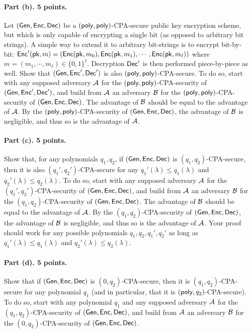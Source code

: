 \documentclass{article}
\begin{document}
\paragraph{Part (b). 5 points.} Let $({\sf Gen},{\sf Enc},{\sf Dec})$ be a $({\sf poly},{\sf poly})$-CPA-secure public key encryption scheme, but which is only capable of encrypting a single bit (as opposed to arbitrary bit strings). A simple way to extend it to arbitrary bit-strings is to encrypt bit-by-bit: ${\sf Enc}'({\sf pk},m)=({\sf Enc}({\sf pk},m_0),{\sf Enc}({\sf pk},m_1),\cdots,{\sf Enc}({\sf pk},m_\ell))$ where $m=(m_1,\cdots,m_\ell)\in\{0,1\}^\ell$. Decryption ${\sf Dec}'$ is then performed piece-by-piece as well. Show that $({\sf Gen},{\sf Enc}',{\sf Dec}')$ is also $({\sf poly},{\sf poly})$-CPA-secure. To do so, start with any supposed adversary ${\mathcal{A}}$ for the $({\sf poly},{\sf poly})$-CPA-security of $({\sf Gen},{\sf Enc}',{\sf Dec}')$, and build from ${\mathcal{A}}$ an adversary ${\mathcal{B}}$ for the $({\sf poly},{\sf poly})$-CPA-security of $({\sf Gen},{\sf Enc},{\sf Dec})$. The advantage of ${\mathcal{B}}$ should be equal to the advantage of ${\mathcal{A}}$. By the $({\sf poly},{\sf poly})$-CPA-security of $({\sf Gen},{\sf Enc},{\sf Dec})$, the advantage of ${\mathcal{B}}$ is negligible, and thus so is the advantage of ${\mathcal{A}}$.

\paragraph{Part (c). 5 points.} Show that, for any polynomials $q_1,q_2$, if $({\sf Gen},{\sf Enc},{\sf Dec})$ is $(q_1,q_2)$-CPA-secure, then it is also $(q_1',q_2')$-CPA-secure for any $q_1'(\lambda)\leq q_1(\lambda)$ and $q_2'(\lambda)\leq q_2(\lambda)$. To do so, start with any supposed adversary ${\mathcal{A}}$ for the $(q_1',q_2')$-CPA-security of $({\sf Gen},{\sf Enc},{\sf Dec})$, and build from ${\mathcal{A}}$ an adversary ${\mathcal{B}}$ for the $(q_1,q_2)$-CPA-security of $({\sf Gen},{\sf Enc},{\sf Dec})$. The advantage of ${\mathcal{B}}$ should be equal to the advantage of ${\mathcal{A}}$. By the $(q_1,q_2)$-CPA-security of $({\sf Gen},{\sf Enc},{\sf Dec})$, the advantage of ${\mathcal{B}}$ is negligible, and thus so is the advantage of ${\mathcal{A}}$. Your proof should work for any possible polynomials $q_1,q_2,q_1',q_2'$ as long as $q_1'(\lambda)\leq q_1(\lambda)$ and $q_2'(\lambda)\leq q_2(\lambda)$. 

\paragraph{Part (d). 5 points.} Show that if $({\sf Gen},{\sf Enc},{\sf Dec})$ is $(0,q_2)$-CPA-secure, then it is $(q_1,q_2)$-CPA-secure for any polynomial $q_1$ (and in particular, that it is $({\sf poly},q_2)$-CPA-secure). To do so, start with any polynomial $q_1$ and any supposed adversary ${\mathcal{A}}$ for the $(q_1,q_2)$-CPA-security of $({\sf Gen},{\sf Enc},{\sf Dec})$, and build from ${\mathcal{A}}$ an adversary ${\mathcal{B}}$ for the $(0,q_2)$-CPA-security of $({\sf Gen},{\sf Enc},{\sf Dec})$. 
\end{document}
